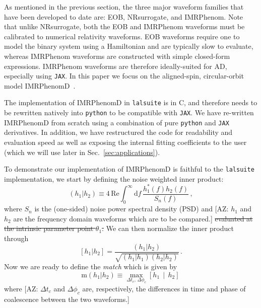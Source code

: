 \documentclass[twocolumn]{aastex631}
\newcommand{\jax}{\texttt{JAX}\xspace}
\newcommand{\lalsuite}{\texttt{lalsuite}\xspace}
\newcommand{\AZ}[1]{{\color{Burnt}[AZ: #1]}}
\begin{document}
As mentioned in the previous section, the three major waveform families that have been developed to date are:  EOB,  NRsurrogate, and IMRPhenom.
Note that unlike NRsurrogate, both the EOB and IMRPhenom waveforms must be calibrated to numerical relativity waveforms.
EOB waveforms require one to model the binary system using a Hamiltonian and are typically slow to evaluate, whereas IMRPhenom waveforms are constructed with simple closed-form expressions.
IMRPhenom waveforms are therefore ideally-suited for AD, especially using \jax. 
In this paper we focus on the aligned-spin, circular-orbit model IMRPhenomD~\citep{Husa:2015iqa, Khan:2015jqa}.

The implementation of IMRPhenomD in \lalsuite is in C, and therefore needs to be rewritten natively into \texttt{python} to be compatible with \jax.
We have re-written IMRPhenomD from scratch using a combination of pure \texttt{python} and \jax derivatives.
In addition, we have restructured the code for readability and evaluation speed as well as exposing the internal fitting coefficients to the user (which we will use later in Sec.~\ref{sec:applications}).

To demonstrate our implementation of IMRPhenomD is faithful to the \lalsuite implementation, we start by defining the noise weighted inner product:
\begin{equation}
    \label{eq:inner_prod}
    \left(h_1|h_2\right) \equiv 4 \, \mathrm{Re} \int^{\infty}_{0} \mathrm{d} f \, \frac{ h^*_1(f) h_2(f)}{S_n(f)}\, ,
\end{equation}
where $S_n$ is the (one-sided) noise power spectral density (PSD) and \AZ{$h_1$ and $h_2$ are the frequency domain waveforms which are to be compared.}
\sout{ evaluated at the intrinsic parameter point $\theta_1$.}
We can then normalize the inner product through
\begin{equation}
    \left[h_1|h_2\right] = \frac{\left(h_1|h_2\right)}{\sqrt{\left(h_1|h_1\right)\left(h_2|h_2\right)}}\, .
\end{equation}
Now we are ready to define the \textit{match} which is given by 
\begin{equation}
    \mathrm{m}(h_1|h_2) \equiv \max_{\Delta t_c,\, \Delta \phi_c} \left[h_1 \, \middle| \, h_2 \right]\,
\end{equation}
where \AZ{$\Delta t_c$ and $\Delta \phi_c$ are, respectively, the differences in time and phase of coalescence between the two waveforms.}
\end{document}
